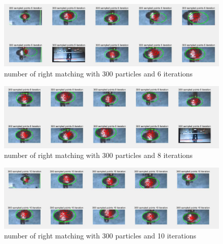 \begin{figure}[H]
\centering%
\includegraphics[width=5in]{300n6i.jpg}
\caption{number of right matching with 300 particles and 6 iterations}
\label{Fig.8}
\end{figure}


\begin{figure}[H]
\centering%
\includegraphics[width=5in]{300n8icompare.jpg}
\caption{number of right matching with 300 particles and 8 iterations}
\label{Fig.9}
\end{figure}


\begin{figure}[H]
\centering%
\includegraphics[width=5in]{300n10icompare.jpg}
\caption{number of right matching with 300 particles and 10 iterations}
\label{Fig.10}
\end{figure}


 